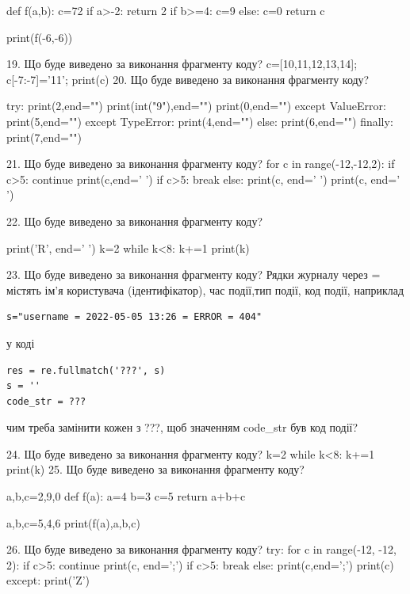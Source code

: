 \documentclass[11pt]{article}
\begin{document}
def f(a,b):
    c=72
    if a>-2:
        return 2
    if b>=4:
         c=9
    else: 
        c=0
    return c

print(f(-6,-6))

19. Що буде виведено за виконання фрагменту коду?
c=[10,11,12,13,14]; c[-7:-7]='11'; print(c)
20. Що буде виведено за виконання фрагменту коду?

try:
    print(2,end="")
    print(int("9"),end="")
    print(0,end="")
except ValueError: print(5,end="")
except TypeError: print(4,end="")
else: print(6,end="")
finally: print(7,end="")


21. Що буде виведено за виконання фрагменту коду?
for c in range(-12,-12,2):
    if c>5:
        continue
        print(c,end=' ')
    if c>5:
        break
else:
    print(c, end=' ')
print(c, end=' ')

22. Що буде виведено за виконання фрагменту коду?

print('R', end=' ')
k=2
while k<8:
    k+=1
print(k)


23. Що буде виведено за виконання фрагменту коду?
Рядки журналу через = містять ім'я користувача (ідентифікатор), час події,тип події, код події, наприклад
\begin{verbatim}
s="username = 2022-05-05 13:26 = ERROR = 404"
\end{verbatim}
у коді 
\begin{verbatim}
res = re.fullmatch('???', s) 
s = ''
code_str = ??? 
\end{verbatim}
чим треба замінити кожен з ???, щоб значенням code\_str був код події? 



24. Що буде виведено за виконання фрагменту коду?
k=2
   while k<8: k+=1
   print(k)
25. Що буде виведено за виконання фрагменту коду?

a,b,c=2,9,0
def f(a):
    a=4
    b=3
    c=5
    return a+b+c

a,b,c=5,4,6
print(f(a),a,b,c)

26. Що буде виведено за виконання фрагменту коду?
try:
    for c in range(-12, -12, 2):
        if c>5:
            continue
        print(c, end=';')
        if c>5:
            break
    else:
        print(c,end=';')
    print(c)
except:
    print('Z')
\end{document}
